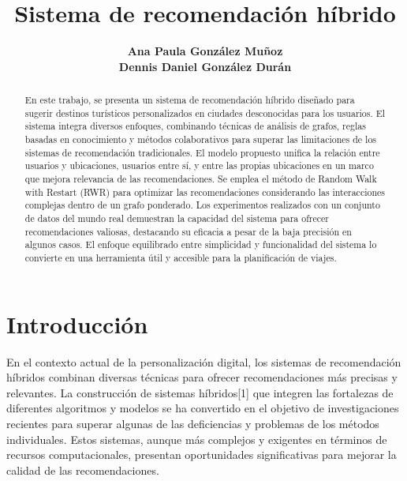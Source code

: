 \documentclass[runningheads]{llncs}
\begin{document}
%
\title{Sistema de recomendación híbrido}
%

\author{
    \textbf{Ana Paula González Muñoz}\\
    \textbf{Dennis Daniel González Durán}
    }

%
\maketitle            
%
\begin{abstract}
 En este trabajo, se presenta un sistema de recomendación híbrido diseñado para sugerir destinos turísticos personalizados en ciudades desconocidas para los usuarios. El sistema integra diversos enfoques, combinando técnicas de análisis de grafos, reglas basadas en conocimiento y métodos colaborativos para superar las limitaciones de los sistemas de recomendación tradicionales. El modelo propuesto unifica la relación entre usuarios y ubicaciones, usuarios entre sí, y entre las propias ubicaciones en un marco que mejora relevancia de las recomendaciones. Se emplea el método de Random Walk with Restart (RWR) para optimizar las recomendaciones considerando las interacciones complejas dentro de un grafo ponderado. Los experimentos realizados con un conjunto de datos del mundo real demuestran la capacidad del sistema para ofrecer recomendaciones valiosas, destacando su eficacia a pesar de la baja precisión en algunos casos. El enfoque equilibrado entre simplicidad y funcionalidad del sistema lo convierte en una herramienta útil y accesible para la planificación de viajes.

\end{abstract}

%

\section{Introducción}

En el contexto actual de la personalización digital, los sistemas de recomendación híbridos combinan diversas técnicas para ofrecer recomendaciones más precisas y relevantes. La construcción de sistemas híbridos[1] que integren las fortalezas de diferentes algoritmos y modelos se ha convertido en el objetivo de investigaciones recientes para superar algunas de las deficiencias y problemas de los métodos individuales. Estos sistemas, aunque más complejos y exigentes en términos de recursos computacionales, presentan oportunidades significativas para mejorar la calidad de las recomendaciones.
\end{document}
